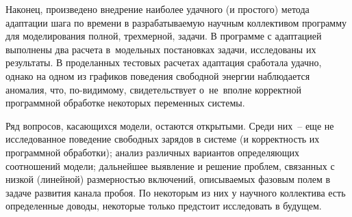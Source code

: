 Наконец, произведено внедрение наиболее удачного (и простого) метода адаптации шага по времени в разрабатываемую научным коллективом программу для моделирования полной, трехмерной, задачи. В программе с адаптацией выполнены два расчета в~модельных постановках задачи, исследованы их результаты. В проделанных тестовых расчетах адаптация сработала удачно, однако на одном из графиков поведения свободной энергии наблюдается аномалия, что, по-видимому, свидетельствует о~не~вполне корректной программной обработке некоторых переменных системы.

Ряд вопросов, касающихся модели, остаются открытыми. Среди них~-- еще не исследованное поведение свободных зарядов в системе (и корректность их программной обработки); анализ различных вариантов определяющих соотношений модели; дальнейшее выявление и решение проблем, связанных с низкой (линейной) размерностью включений, описываемых фазовым полем в задаче развития канала пробоя. По некоторым из них у научного коллектива есть определенные доводы, некоторые только предстоит исследовать в будущем.